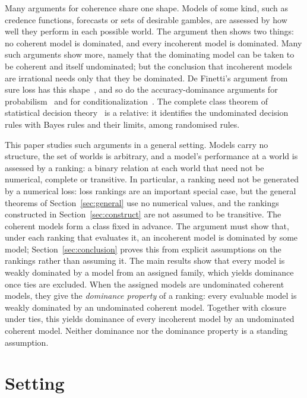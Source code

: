 \documentclass[11pt]{article}
\theoremstyle{definition}
\begin{document}
Many arguments for coherence share one shape. Models of some kind, such as credence functions, forecasts or sets of desirable gambles, are assessed by how well they perform in each possible world. The argument then shows two things: no coherent model is dominated, and every incoherent model is dominated. Many such arguments show more, namely that the dominating model can be taken to be coherent and itself undominated; but the conclusion that incoherent models are irrational needs only that they be dominated. De Finetti's argument from sure loss has this shape~\cite{deFinetti1974}, and so do the accuracy-dominance arguments for probabilism~\cite{Joyce2009,Predd2009,SSK2009,Pettigrew2022,Nielsen2023} and for conditionalization~\cite{Briggs2020,Nielsen2021}. The complete class theorem of statistical decision theory~\cite{Wald1950} is a relative: it identifies the undominated decision rules with Bayes rules and their limits, among randomised rules.

This paper studies such arguments in a general setting. Models carry no structure, the set of worlds is arbitrary, and a model's performance at a world is assessed by a ranking: a binary relation at each world that need not be numerical, complete or transitive. In particular, a ranking need not be generated by a numerical loss: loss rankings are an important special case, but the general theorems of Section~\ref{sec:general} use no numerical values, and the rankings constructed in Section~\ref{sec:construct} are not assumed to be transitive. The coherent models form a class fixed in advance. The argument must show that, under each ranking that evaluates it, an incoherent model is dominated by some model; Section~\ref{sec:conclusion} proves this from explicit assumptions on the rankings rather than assuming it. The main results show that every model is weakly dominated by a model from an assigned family, which yields dominance once ties are excluded. When the assigned models are undominated coherent models, they give the \emph{dominance property} of a ranking: every evaluable model is weakly dominated by an undominated coherent model. Together with closure under ties, this yields dominance of every incoherent model by an undominated coherent model. Neither dominance nor the dominance property is a standing assumption.




\newpage


\section{Setting}\label{sec:setting}
\end{document}
